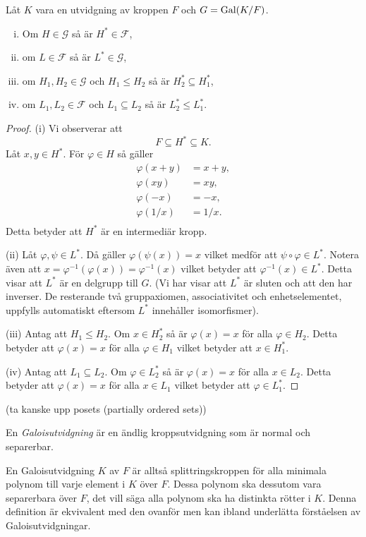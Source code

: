 \documentclass{article}
\newcommand{\gal}[0]{\textnormal{Gal}}
\theoremstyle{definition}
\begin{document}
\begin{mylemma}{}{}
  Låt $K$ vara en utvidgning av kroppen $F$ och $G = \gal(K/F)$.
  \begin{enumerate}[(i)]
    \item Om $H \in \mathcal{G}$ så är $H^* \in \mathcal{F}$,
    \item om $L \in \mathcal{F}$ så är $L^* \in \mathcal{G}$,
    \item om $H_1, H_2 \in \mathcal{G}$ och $H_1 \leq H_2$ så är $H_2^* \subseteq H_1^*$,
    \item om $L_1, L_2 \in \mathcal{F}$ och $L_1 \subseteq L_2$ så är $L_2^* \leq L_1^*$.
  \end{enumerate}
\end{mylemma}

\begin{proof}
  (i) Vi observerar att 
  \[F \subseteq H^* \subseteq K.\]
  Låt $x, y \in H^*$. För $\varphi \in H$ så gäller 
  \begin{align*}
    \varphi(x + y) &= x + y, \\
    \varphi(xy) &= xy, \\
    \varphi(-x) &= -x, \\
    \varphi(1/x) &= 1/x. \\
  \end{align*}
  Detta betyder att $H^*$ är en intermediär kropp.

  (ii) Låt $\varphi, \psi \in L^*$. Då gäller $\varphi(\psi(x)) = x$ vilket medför att $\psi \circ \varphi \in L^*$. 
  Notera även att $x = \varphi^{-1}(\varphi(x)) = \varphi^{-1}(x)$ vilket betyder att $\varphi^{-1}(x) \in L^*$. Detta visar att $L^*$ är en delgrupp till $G$.
  (Vi har visar att $L^*$ är sluten och att den har inverser. De resterande två gruppaxiomen, associativitet och enhetselementet, uppfylls automatiskt
  eftersom $L^*$ innehåller isomorfismer).

  (iii) Antag att $H_1 \leq H_2$. Om $x \in H_2^*$ så är $\varphi(x) = x$ för alla $\varphi \in H_2.$ Detta betyder att $\varphi(x) = x$ för alla $\varphi \in H_1$
  vilket betyder att $x \in H_1^*.$

  (iv) Antag att $L_1 \subseteq L_2$. Om $\varphi \in L_2^*$ så är $\varphi(x) = x$ för alla $x \in L_2$. Detta betyder att $\varphi(x) = x$ för alla $x \in L_1$
  vilket betyder att $\varphi \in L_1^*.$
\end{proof}

(ta kanske upp posets (partially ordered sets))

\begin{mydef}{}{}
  En \textit{Galoisutvidgning} är en ändlig kroppsutvidgning som är normal och separerbar.
\end{mydef}
En Galoisutvidgning $K$ av $F$ är alltså splittringskroppen för alla minimala polynom till varje element i $K$ över $F$. Dessa polynom ska 
dessutom vara separerbara över $F$, det vill säga alla polynom ska ha distinkta rötter i $K$. Denna 
definition är ekvivalent med den ovanför men kan ibland underlätta förståelsen av Galoisutvidgningar.
\end{document}
